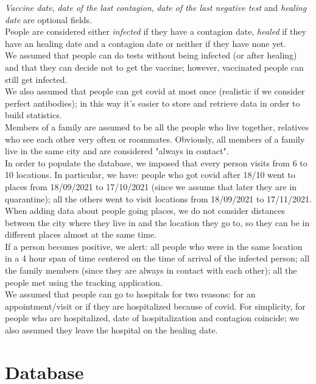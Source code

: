 \documentclass[12pt, a4paper]{article}
\begin{document}
\emph{Vaccine date}, \emph{date of the last contagion}, \emph{date of the last 
negative test} and \emph{healing date} are optional fields. \\
People are considered either \emph{infected} if they have a contagion date, 
\emph{healed} if they have an healing date and a contagion date or neither if 
they have none yet. \\
We assumed that people can do tests without being infected (or after healing) 
and that they can decide not to get the vaccine; however, vaccinated people can 
still get infected. \\
We also assumed that people can get covid at most once (realistic if we 
consider perfect antibodies); in this way it's easier to store and retrieve 
data in order to build statistics. \\
Members of a family are assumed to be all the people who live together, 
relatives who see each other very often or roommates. Obviously, all members 
of a family live in the same city and are considered "always in contact". \\  
In order to populate the database, we imposed that every person visits from 6 
to 10 locations. In particular, we have: people who got covid after 18/10 went to places 
from 18/09/2021 to 17/10/2021 (since we assume that later they are in 
quarantine); all the others went to visit locations from 18/09/2021 to 
17/11/2021. 
When adding data about people going places, we do not consider distances 
between the city where they live in and the location they go to, so they can 
be in different places almost at the same time. \\ 
If a person becomes positive, we alert: all people who were in the same location
in a 4 hour span of time centered on the time of arrival of the infected
person; all the family members (since they are always in contact with each other); 
all the people met using the tracking application. \\
We assumed that people can go to hospitals for two reasons: for an 
appointment/visit or if they are hospitalized because of covid. For simplicity, 
for people who are hospitalized, date of hospitalization and contagion coincide;
we also assumed they leave the hospital on the healing date.  

\clearpage

\section{Database}
\end{document}
